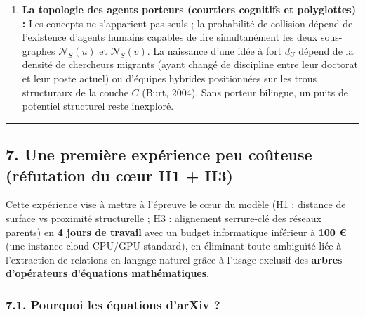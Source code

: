 \documentclass[a4paper,11pt]{article}
\begin{document}
\begin{enumerate}
  est freinée par l'organisation sociale des disciplines. Bromham,
  Dinnage et Hua (2016) ont démontré sur 18 476 projets soumis à
  l'\emph{Australian Research Council} que plus la distance
  interdisciplinaire d'un projet est élevée, plus sa probabilité de
  financement diminue. Il faut ajouter à l'équation de naissance
  \(\lambda_{uv}(t)\) un terme de \textbf{friction institutionnelle}
  \(F_{\text{inst}}(p_u, p_v)\) mesuré par l'absence de revues ou de
  comités d'évaluation chevauchant les communautés de \(u\) et de \(v\).
\item
  \textbf{La topologie des agents porteurs (courtiers cognitifs et
  polyglottes) :} Les concepts ne s'apparient pas seuls ; la probabilité
  de collision dépend de l'existence d'agents humains capables de lire
  simultanément les deux sous-graphes \(\mathcal{N}_S(u)\) et
  \(\mathcal{N}_S(v)\). La naissance d'une idée à fort \(d_U\) dépend de
  la densité de chercheurs migrants (ayant changé de discipline entre
  leur doctorat et leur poste actuel) ou d'équipes hybrides positionnées
  sur les trous structuraux de la couche \(C\) (Burt, 2004). Sans
  porteur bilingue, un puits de potentiel structurel reste inexploré.
\end{enumerate}

\begin{center}\rule{0.5\linewidth}{0.5pt}\end{center}

\subsection*{7. Une première expérience peu coûteuse (réfutation du cœur
H1 + H3)}

Cette expérience vise à mettre à l'épreuve le cœur du modèle (H1 :
distance de surface vs proximité structurelle ; H3 : alignement
serrure-clé des réseaux parents) en \textbf{4 jours de travail} avec un
budget informatique inférieur à \textbf{100 €} (une instance cloud
CPU/GPU standard), en éliminant toute ambiguïté liée à l'extraction de
relations en langage naturel grâce à l'usage exclusif des \textbf{arbres
d'opérateurs d'équations mathématiques}.

\subsubsection*{7.1. Pourquoi les équations d'arXiv ?}
\end{document}

